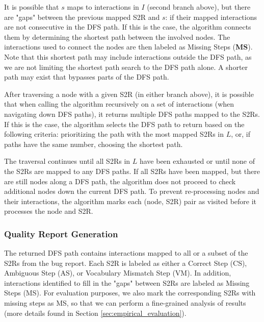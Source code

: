 It is possible that $s$ maps to interactions in $I$ (second branch above), but there are "gaps" between the previous mapped S2R and $s$: if their mapped interactions are not consecutive in the DFS path. 
If this is the case, the algorithm connects them by determining the shortest path between the involved nodes. 
The interactions used to connect the nodes are then labeled as Missing Steps (\textbf{MS}). 
Note that this shortest path may include interactions outside the DFS path, as we are not limiting the shortest path search to the DFS path alone. A shorter path may exist that bypasses parts of the DFS path.

After traversing a node with a given S2R (in either branch above), it is possible that when calling the algorithm recursively on a set of interactions (\ie when navigating down DFS paths), it returns multiple DFS paths mapped to the S2Rs. 
If this is the case, the algorithm selects the DFS path to return based on the following criteria: prioritizing the path with the most mapped S2Rs in $L$, or, if paths have the same number, choosing the shortest path.

The traversal continues until all S2Rs in $L$ have been exhausted or until none of the S2Rs are mapped to any DFS paths. 
If all S2Rs have been mapped, but there are still nodes along a DFS path, the algorithm does not proceed to check additional nodes down the current DFS path.
To prevent re-processing nodes and their interactions, the algorithm marks each (node, S2R) pair as visited before it processes the node and S2R.

\subsubsection{Quality Report Generation}

The returned DFS path contains interactions mapped to all or a subset of the S2Rs from the bug report. Each S2R is labeled as either a Correct Step (CS), Ambiguous Step (AS), or Vocabulary Mismatch Step (VM).  
In addition, interactions identified to fill in the "gaps" between S2Rs are labeled as Missing Steps (MS). 
For evaluation purposes, we also mark the corresponding S2Rs with missing steps as MS, so that we can perform a fine-grained analysis of results (more details found in Section \ref{sec:empirical_evaluation}).
